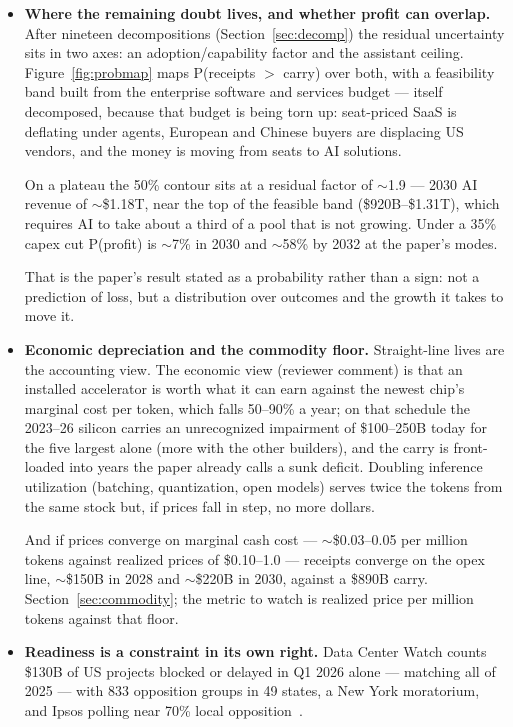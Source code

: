\documentclass[11pt,letterpaper]{article}
\begin{document}
\begin{itemize}
    Two years of the labs' pace would clear the plateau path by 2029. The sector chains below are the reasons the paper expects deceleration; whether it comes is the 2027--28 test (Section~\ref{sec:falsify}).
    \item \textbf{Where the remaining doubt lives, and whether profit can overlap.} After nineteen decompositions (Section~\ref{sec:decomp}) the residual uncertainty sits in two axes: an adoption/capability factor and the assistant ceiling. Figure~\ref{fig:probmap} maps P(receipts $>$ carry) over both, with a feasibility band built from the enterprise software and services budget --- itself decomposed, because that budget is being torn up: seat-priced SaaS is deflating under agents, European and Chinese buyers are displacing US vendors, and the money is moving from seats to AI solutions.

    On a plateau the 50\% contour sits at a residual factor of $\sim$1.9 --- 2030 AI revenue of $\sim$\$1.18T, near the top of the feasible band (\$920B--\$1.31T), which requires AI to take about a third of a pool that is not growing. Under a 35\% capex cut P(profit) is $\sim$7\% in 2030 and $\sim$58\% by 2032 at the paper's modes.

    That is the paper's result stated as a probability rather than a sign: not a prediction of loss, but a distribution over outcomes and the growth it takes to move it.
    \item \textbf{Economic depreciation and the commodity floor.} Straight-line lives are the accounting view. The economic view (reviewer comment) is that an installed accelerator is worth what it can earn against the newest chip's marginal cost per token, which falls 50--90\% a year; on that schedule the 2023--26 silicon carries an unrecognized impairment of \$100--250B today for the five largest alone (more with the other builders), and the carry is front-loaded into years the paper already calls a sunk deficit. Doubling inference utilization (batching, quantization, open models) serves twice the tokens from the same stock but, if prices fall in step, no more dollars.

    And if prices converge on marginal cash cost --- $\sim$\$0.03--0.05 per million tokens against realized prices of \$0.10--1.0 --- receipts converge on the opex line, $\sim$\$150B in 2028 and $\sim$\$220B in 2030, against a \$890B carry. Section~\ref{sec:commodity}; the metric to watch is realized price per million tokens against that floor.
    \item \textbf{Readiness is a constraint in its own right.} Data Center Watch counts \$130B of US projects blocked or delayed in Q1 2026 alone --- matching all of 2025 --- with 833 opposition groups in 49 states, a New York moratorium, and Ipsos polling near 70\% local opposition~\cite{ref:dcw_q1_2026,ref:forbes_consent,ref:tomshw_dcw}.


\end{itemize}
\end{document}
